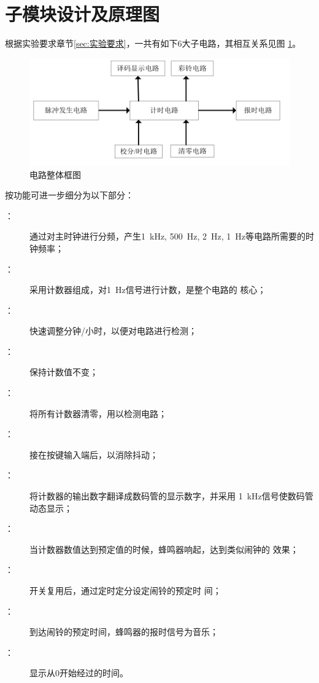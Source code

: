 \documentclass[twoside, openright]{article}
\begin{document}
\section{子模块设计及原理图}%
\label{sec:子模块设计及原理图}

根据实验要求章节\ref{sec:实验要求}，一共有如下6大子电路，其相互关系见图
\ref{fig:电路整体框图}。

\begin{figure}[htbp]
	\centering
	\includegraphics[width=0.8\linewidth]{block.png}
	\caption{电路整体框图}
	\label{fig:电路整体框图}
\end{figure}

按功能可进一步细分为以下部分：

\begin{description}

	\item[：] 通过对主时钟进行分频，产生\SI{1}{\kHz},
		\SI{500}{\Hz}, \SI{2}{\Hz}, \SI{1}{\Hz}等电路所需要的时钟频率；

	\item[：] 采用计数器组成，对\SI{1}{\Hz}信号进行计数，是整个电路的
		核心；

	\item[：] 快速调整分钟/小时，以便对电路进行检测；

	\item[：] 保持计数值不变；

	\item[：] 将所有计数器清零，用以检测电路；

	\item[：] 接在按键输入端后，以消除抖动；

	\item[：] 将计数器的输出数字翻译成数码管的显示数字，并采用
		\SI{1}{\kHz}信号使数码管动态显示；

	\item[：] 当计数器数值达到预定值的时候，蜂鸣器响起，达到类似闹钟的
		效果；

	\item[：] 开关复用后，通过定时定分设定闹铃的预定时
		间；

	\item[：] 到达闹铃的预定时间，蜂鸣器的报时信号为音乐；

	\item[：] 显示从0开始经过的时间。

\end{description}
\end{document}
